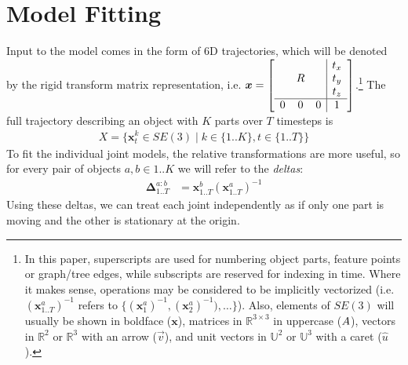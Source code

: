 \documentclass{article} %
\newcommand\mat[2]{\ensuremath{\left[\begin{array}{#1}#2\end{array}\right]}}
\def\xmat{\uppercase}    \def\xmatstr{in uppercase}
\def\xvec{\vec}          \def\xvecstr{with an arrow}
\def\xuv{\hat}           \def\xuvstr{with a caret}
\def\xse{\bm}            \def\xsestr{in boldface}
\begin{document}
\section{Model Fitting}
Input to the model comes in the form of 6D trajectories, which will be denoted by the rigid transform matrix representation, i.e. $\xse{x} = \mat{ccc|c}{&&& t_x \\ & \xmat{r} && t_y \\ &&& t_z \\\hline 0 & 0 & 0 & 1}$.\footnote{In this paper, superscripts are used for numbering object parts, feature points or graph/tree edges, while subscripts are reserved for indexing in time. Where it makes sense, operations may be considered to be implicitly vectorized (i.e. $(\xse{x}_{1..T}^a)^{-1}$ refers to $\{(\xse{x}_1^a)^{-1}, (\xse{x}_2^a)^{-1}), \dots\}$). Also, elements of $SE(3)$ will usually be shown \xsestr{} ($\xse{x}$), matrices in $\mathbb{R}^{3 \times 3}$ \xmatstr{} ($\xmat{a}$), vectors in $\mathbb{R}^2$ or $\mathbb{R}^3$ \xvecstr{} ($\xvec{v}$), and unit vectors in $\mathbb{U}^2$ or $\mathbb{U}^3$ \xuvstr{ } ($\xuv{u}$).} The full trajectory describing an object with $K$ parts over $T$ timesteps is
\begin{align}
  X = \{ \xse{x}_t^k \in SE(3) \mid k \in \{1..K\}, t \in \{1..T\} \}
\end{align}
To fit the individual joint models, the relative transformations are more useful, so for every pair of objects $a, b \in 1..K$ we will refer to the \emph{deltas}:
\begin{align}
  \xse{\Delta}_{1..T}^{a:b} &= \xse{x}_{1..T}^{b} (\xse{x}_{1..T}^{a})^{-1}
\end{align}
Using these deltas, we can treat each joint independently as if only one part is moving and the other is stationary at the origin.
\end{document}
